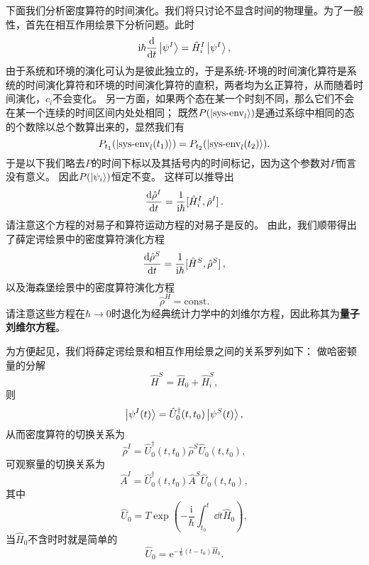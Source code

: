 \documentclass[hyperref, UTF8, a4paper]{ctexart}
\newcommand*{\ii}{\mathrm{i}}
\newcommand*{\ee}{\mathrm{e}}
\newcommand*{\const}{\mathrm{const}}
\begin{document}
下面我们分析密度算符的时间演化。我们将只讨论不显含时间的物理量。为了一般性，首先在相互作用绘景下分析问题。此时
\[
    \ii \hbar \dv{t} \ket{\psi^I} = \hat{H}_i^I \ket{\psi^I},
\]
由于系统和环境的演化可认为是彼此独立的，于是系统-环境的时间演化算符是系统的时间演化算符和环境的时间演化算符的直积，两者均为幺正算符，从而随着时间演化，$c_i$不会变化。
另一方面，如果两个态在某一个时刻不同，那么它们不会在某一个连续的时间区间内处处相同；
既然$P(\ket{\text{sys-env}_l})$是通过系综中相同的态的个数除以总个数算出来的，显然我们有
\[
    P_{t_1} (\ket{\text{sys-env}_l (t_1)}) = P_{t_2} (\ket{\text{sys-env}_l (t_2)}).
\]
于是以下我们略去$P$的时间下标以及其括号内的时间标记，因为这个参数对$P$而言没有意义。
因此$P(\ket{\psi_i})$恒定不变。
这样可以推导出
\begin{equation}
    \dv{\hat{\rho}^I}{t} = \frac{1}{\ii \hbar} \comm*{\hat{H}_i^I}{\hat{\rho}^I}.
\end{equation}
请注意这个方程的对易子和算符运动方程的对易子是反的。
由此，我们顺带得出了薛定谔绘景中的密度算符演化方程
\begin{equation}
    \dv{\hat{\rho}^S}{t} = \frac{1}{\ii \hbar} \comm*{\hat{H}^S}{\hat{\rho}^S},
    \label{eq:quantum-liouville}
\end{equation}
以及海森堡绘景中的密度算符演化方程
\begin{equation}
    \hat{\rho}^H = \const.
\end{equation}
请注意这些方程在$\hbar \to 0$时退化为经典统计力学中的刘维尔方程，因此称其为\textbf{量子刘维尔方程}。

为方便起见，我们将薛定谔绘景和相互作用绘景之间的关系罗列如下：
做哈密顿量的分解
\begin{equation}
    \hat{H}^S = \hat{H}_0 + \hat{H}_i^S,
\end{equation}
则
\begin{equation}
    \ket{\psi^I(t)} = \hat{U}_0^\dagger(t,t_0) \ket{\psi^S(t)},
\end{equation}
从而密度算符的切换关系为
\begin{equation}
    \hat{\rho}^I = \hat{U}_0^\dagger(t,t_0) \hat{\rho}^S \hat{U}_0(t,t_0),
\end{equation}
可观察量的切换关系为
\begin{equation}
    \hat{A}^I = \hat{U}_0^\dagger(t,t_0) \hat{A}^S \hat{U}_0(t,t_0),
\end{equation}
其中
\begin{equation}
    \hat{U}_0 = T \exp \left( - \frac{\ii}{\hbar} \int_{t_0}^t \dd{t} \hat{H}_0 \right),
\end{equation}
当$\hat{H}_0$不含时时就是简单的
\begin{equation}
    \hat{U}_0 = \ee^{-\frac{\ii}{\hbar} (t-t_0) \hat{H}_0}.
\end{equation}
\end{document}
